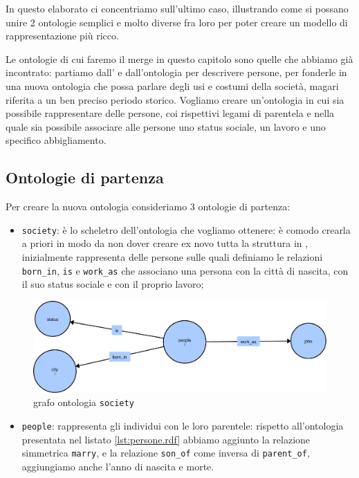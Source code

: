 In questo elaborato ci concentriamo sull'ultimo caso, illustrando come si possano unire 2 ontologie semplici e molto diverse fra loro per poter creare un modello di rappresentazione più ricco.

Le ontologie di cui faremo il merge in questo capitolo sono quelle che abbiamo già incontrato: partiamo dall' e dall'ontologia per descrivere persone, per fonderle in una nuova ontologia che possa parlare degli usi e costumi della società, magari riferita a un ben preciso periodo storico. Vogliamo creare un'ontologia in cui sia possibile rappresentare delle persone, coi rispettivi legami di parentela e nella quale sia possibile associare alle persone uno status sociale, un lavoro e uno specifico abbigliamento.

\subsection{Ontologie di partenza}
Per creare la nuova ontologia consideriamo 3 ontologie di partenza:
\begin{itemize}
	\item \verb|society|: è lo scheletro dell'ontologia che vogliamo ottenere: è comodo crearla a priori in modo da non dover creare ex novo tutta la struttura in \cduce, inizialmente rappresenta delle persone sulle quali definiamo le relazioni \verb|born_in|, \verb|is| e \verb|work_as| che associano una persona con la città di nascita, con il suo status sociale e con il proprio lavoro;
\end{itemize}
\begin{figure}[H]
	\centering
	\includegraphics[width=.9\textwidth]{Picture/society.rdf.pdf}
	\caption{grafo ontologia \texttt{society}}
\end{figure}
\begin{itemize}
	\item \verb|people|: rappresenta gli individui con le loro parentele: rispetto all'ontologia presentata nel listato \ref{lst:persone.rdf} abbiamo aggiunto la relazione simmetrica \verb|marry|, e la relazione \verb|son_of| come inversa di \verb|parent_of|, aggiungiamo anche l'anno di nascita e morte.
\end{itemize}
